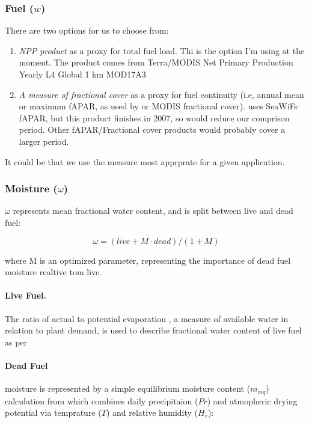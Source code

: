\subsubsection{Fuel ($w$)}
There are two options for us to choose from:
\begin{enumerate}
    \item \textit{NPP product} as a proxy for total fuel load. Thi is the option I'm using at the moment. The product comes from Terra/MODIS Net Primary Production Yearly L4 Global 1 km MOD17A3 \citep{nasa2012terra}
    \item \textit{A measure of fractional cover} as a proxy for fuel continuity (i.e, annual mean or maximum fAPAR, as used by \citet{knorr2014impact,knorr2016climate} or MODIS fractional cover). \citet{bistinas2014causal} uses SeaWiFs fAPAR, but this product finishes in 2007, so would reduce our comprison period. Other fAPAR/Fractional cover products would probably cover a larger period.
\end{enumerate}

It could be that we use the measure most apprprate for a given application.

\subsubsection{Moisture ($\omega$)}

$\omega$ represents mean fractional water content, and is split between live and dead fuel:

\begin{equation}
    \omega = (live + M \cdot dead) / (1 + M)
\end{equation}

where M is an optimized parameter, representing the importance of dead fuel moisture realtive tom live.

\paragraph{Live Fuel.}
The ratio of actual to potential evaporation \citep[$\alpha$][]{prentice1993simulation}, a measure of available water in relation to plant demand, is used to describe fractional water content of live fuel as per \citet{harrison2010fire, bistinas2014causal}

\paragraph{Dead Fuel} moisture is represented by a simple equilibrium moisture content ($m_{mq}$) calculation from \citep{viney1991review} which combines daily precipitaion ($Pr$) and atmopheric drying potential via temprature ($T$) and relative humidity ($H_r$):

